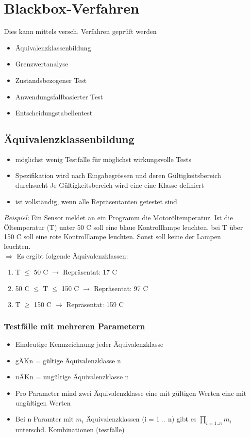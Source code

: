 \documentclass{report}
\theoremstyle{definition}
\theoremstyle{example}
\begin{document}
\section{Blackbox-Verfahren}
Dies kann mittels versch. Verfahren geprüft werden
\begin{itemize}
   \item Äquivalenzklassenbildung
   \item Grenzwertanalyse
   \item Zustandsbezogener Test
   \item Anwendungsfallbasierter Test
   \item Entscheidungstabellentest
\end{itemize}

\subsection{Äquivalenzklassenbildung}
\begin{itemize}
   \item möglichst wenig Testfälle für möglichst wirkungsvolle Tests
   \item Spezifikation wird nach Eingabegrössen und deren Gültigkeitsbereich durchsucht
   \subitem Je Gültigkeitsbereich wird eine eine Klasse definiert
   \item ist vollständig, wenn alle Repräsentanten getestet sind
\end{itemize}

\textit{Beispiel:}
Ein Sensor meldet an ein Programm die Motoröltemperatur. Ist die Öltemperatur (T) unter 50 C soll eine blaue Kontrolllampe
leuchten, bei T über 150 C soll eine rote Kontrolllampe leuchten. Sonst soll keine der Lampen leuchten.\\
$\Rightarrow$ Es ergibt folgende Äquivalenzklassen:
\begin{enumerate}
   \item T $\le$ 50 C $\rightarrow$ Repräsentat: 17 C
   \item 50 C $\leq$ T $\leq$ 150 C $\rightarrow$ Repräsentat: 97 C
   \item T $\ge$ 150 C $\rightarrow$ Repräsentat: 159 C
\end{enumerate}

\subsubsection{Testfälle mit mehreren Parametern}
\begin{itemize}
   \item Eindeutige Kennzeichnung jeder Äquivalenzklasse
   \item gÄKn = gültige Äquivalenzklasse n
   \item uÄKn = ungültige Äquivalenzklasse n
   \item Pro Parameter mind zwei Äquivalenzklasse
   \subitem eine mit gültigen Werten
   \subitem eine mit ungültigen Werten
   \item Bei n Paramter mit $m_i$ Äquivalenzklassen (i = 1 .. n) gibt es $\prod_{i=1..n} m_i$ unterschd. Kombinationen (testfälle) 
\end{itemize}
\end{document}
